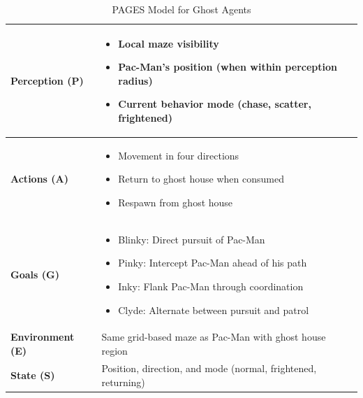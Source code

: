 \documentclass[a4paper, 11pt]{article}
\begin{document}
\begin{table}[h]
\centering
\caption{PAGES Model for Ghost Agents}
\begin{tabular}{|p{2.5cm}|p{11cm}|}
\hline
\textbf{Perception (P)} & 
\begin{itemize}
    \item Local maze visibility
    \item Pac-Man's position (when within perception radius)
    \item Current behavior mode (chase, scatter, frightened)
\end{itemize} \\
\hline
\textbf{Actions (A)} & 
\begin{itemize}
    \item Movement in four directions
    \item Return to ghost house when consumed
    \item Respawn from ghost house
\end{itemize} \\
\hline
\textbf{Goals (G)} & 
\begin{itemize}
    \item Blinky: Direct pursuit of Pac-Man
    \item Pinky: Intercept Pac-Man ahead of his path
    \item Inky: Flank Pac-Man through coordination
    \item Clyde: Alternate between pursuit and patrol
\end{itemize} \\
\hline
\textbf{Environment (E)} & Same grid-based maze as Pac-Man with ghost house region \\
\hline
\textbf{State (S)} & Position, direction, and mode (normal, frightened, returning) \\
\hline
\end{tabular}
\end{table}

\clearpage
\end{document}
